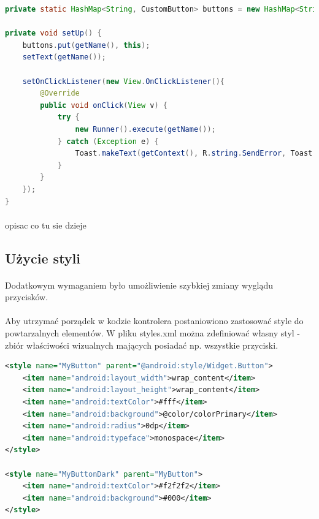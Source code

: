 \begin{lstlisting}[language=Java]
private static HashMap<String, CustomButton> buttons = new HashMap<String, CustomButton>();

private void setUp() {
    buttons.put(getName(), this);
    setText(getName());

    setOnClickListener(new View.OnClickListener(){
        @Override
        public void onClick(View v) {
            try {
                new Runner().execute(getName());
            } catch (Exception e) {
                Toast.makeText(getContext(), R.string.SendError, Toast.LENGTH_SHORT).show();
            }
        }
    });
}
\end{lstlisting}
\paragraph{}
{\color{red}opisac co tu sie dzieje}


\subsection{Użycie styli}
\paragraph{}
Dodatkowym wymaganiem było umożliwienie szybkiej zmiany wyglądu przycisków.
\paragraph{}
Aby utrzymać porządek w kodzie kontrolera postaniowiono zastosować style do powtarzalnych elementów. W pliku styles.xml można zdefiniować własny styl - zbiór właściwości wizualnych mających posiadać np. wszystkie przyciski.


\begin{lstlisting}[language=XML]
 <style name="MyButton" parent="@android:style/Widget.Button">
    <item name="android:layout_width">wrap_content</item>
    <item name="android:layout_height">wrap_content</item>
    <item name="android:textColor">#fff</item>
    <item name="android:background">@color/colorPrimary</item>
    <item name="android:radius">0dp</item>
    <item name="android:typeface">monospace</item>
</style>

<style name="MyButtonDark" parent="MyButton">
    <item name="android:textColor">#f2f2f2</item>
    <item name="android:background">#000</item>
</style>
\end{lstlisting}

